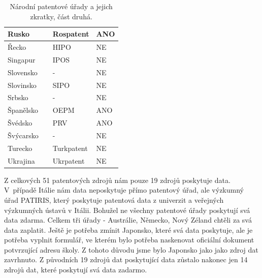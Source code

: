\begin{table}[H]
\begin{tabular}{|>{\centering\arraybackslash}p{2.2cm}|>{\centering\arraybackslash}p{7.5cm}|>{\centering\arraybackslash}p{2cm}|>{\centering\arraybackslash}p{1cm}|}
	\hline
	Rusko & \MYhref{https://rospatent.gov.ru/}{Federal Service for Intellectual Property}  & Rospatent   & ANO      \\ 
	\hline
	Řecko & \MYhref{http://www.obi.gr/el/}{Hellenic Industrial Property Organization}  & HIPO   & NE      \\ 
	\hline
	Singapur & \MYhref{http://www.ipos.gov.sg/}{Intellectual Property Office of Singapore}  & IPOS    & NE     \\ 
	\hline
	Slovensko & \MYhref{https://www.indprop.gov.sk/}{Industrial Property Office of the Slovak Republic}  & -     & NE    \\ 
	\hline
	Slovinsko & \MYhref{http://www.uil-sipo.si/}{Slovenian Intellectual Property Office}  & SIPO   & NE      \\ 
	\hline
	Srbsko & \MYhref{http://www.zis.gov.rs/}{Intellectual Property Office of the Republic of Serbia}  & -   & NE      \\ 
	\hline
	Španělsko & \MYhref{http://www.oepm.es/}{Spanish Patent and Trademark Office}  & OEPM   & ANO      \\ 
	\hline
	Švédsko & \MYhref{http://www.prv.se/}{Swedish Intellectual Property Office}  & PRV   & ANO      \\ 
	\hline
	Švýcarsko & \MYhref{https://www.ige.ch/}{Swiss Federal Institute of Intellectual Property}  & -     & NE    \\ 
	\hline
	Turecko & \MYhref{http://www.turkpatent.gov.tr/}{Turkish Patent and Trademark Office}  & Turkpatent   & NE      \\ 
	\hline
	Ukrajina & \MYhref{https://ukrpatent.org/en}{Ukrainian Intellectual Property Institute}  & Ukrpatent    & NE     \\ 
	\hline
	\end{tabular}
	\caption{Národní patentové úřady a jejich zkratky, část druhá.}
	\label{tab:table_offices2}
	\end{table}
\newpage

\noindent Z celkových 51 patentových zdrojů nám pouze 19 zdrojů poskytuje data. V~případě Itálie nám data neposkytuje přímo patentový úřad, ale výzkumný úřad PATIRIS, který poskytuje patentová data z univerzit a veřejných výzkumných ústavů v Itálii. 
\newline
\indent Bohužel ne všechny patentové úřady poskytují svá data zdarma. Celkem tři úřady - Austrálie, Německo, Nový Zéland chtěli za svá data zaplatit. 
\newline
\indent Ještě je potřeba zmínit Japonsko, které svá data poskytuje, ale je potřeba vyplnit formulář, ve kterém bylo potřeba naskenovat oficiální dokument potvrzující adresu školy. Z tohoto důvodu jsme bylo Japonsko jako jako zdroj dat zavrhnuto. Z původních 19 zdrojů dat poskytující data zůstalo nakonec jen 14 zdrojů dat, které poskytují svá data zadarmo.

